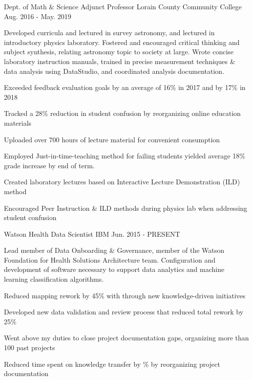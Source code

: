 \begin{cventries}
  \cventry
    {Dept. of Math \& Science} %
    {Adjunct Professor} %
    {Lorain County Community College} %
    {Aug. 2016 - May. 2019} %
    {
      \begin{cvparagraph}
        Developed curricula and lectured in survey astronomy, and lectured in introductory physics laboratory.  Fostered and encouraged critical thinking and subject synthesis, relating astronomy topic to society at large.  Wrote concise laboratory instruction manuals, trained in precise measurement techniques \& data analysis using DataStudio, and coordinated analysis documentation.
      \end{cvparagraph}
      \begin{cvitems} %
        \item {Exceeded feedback evaluation goals by an average of 16\% in 2017 and by 17\% in 2018}
        \item {Tracked a 28\% reduction in student confusion by reorganizing online education materials}
        \item {Uploaded over 700 hours of lecture material for convenient consumption}
        \item {Employed Just-in-time-teaching method for failing students yielded average 18\% grade increase by end of term.}
        \item {Created laboratory lectures based on Interactive Lecture Demonstration (ILD) method}
        \item {Encouraged Peer Instruction \& ILD methods during physics lab when addressing student confusion}
      \end{cvitems}
    }

  \cventry
    {Watson Health} %
    {Data Scientist} %
    {IBM} %
    {Jun. 2015 - PRESENT} %
    {
      \begin{cvparagraph}
        Lead member of Data Onboarding \& Governance, member of the Watson Foundation for Health Solutions Architecture team.  Configuration and development of software necessary to support data analytics and machine learning classification algorithms.
      \end{cvparagraph}
      \begin{cvitems} %
        \item {Reduced mapping rework by 45\% with through new knowledge-driven initiatives}
        \item {Developed new data validation and review process that reduced total rework by 25\%}
        \item {Went above my duties to close project documentation gaps, organizing more than 100 past projects}
        \item {Reduced time spent on knowledge transfer by \% by reorganizing project documentation}
      \end{cvitems}
    }


\end{cventries}
